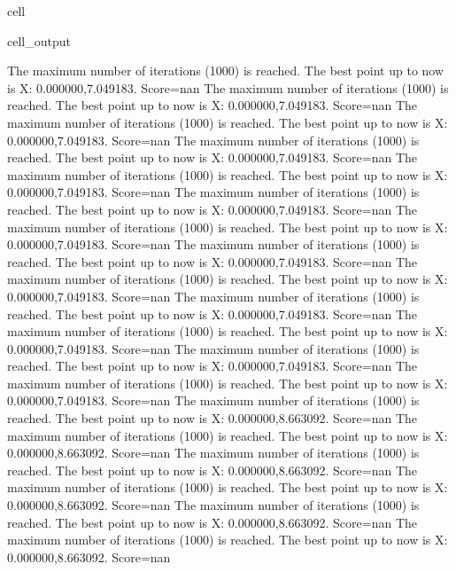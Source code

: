 \documentclass[letterpaper,10pt,english]{jupyterBook}
\begin{document}
\begin{sphinxuseclass}{cell}
\begin{sphinxVerbatimOutput}
\begin{sphinxuseclass}{cell_output}
\begin{sphinxVerbatim}[commandchars=\\\{\}]
The maximum number of iterations (1000) is reached. The best point up to now is X: \PYGZob{}0.000000,7.049183\PYGZcb{}. Score=\PYGZhy{}nan
The maximum number of iterations (1000) is reached. The best point up to now is X: \PYGZob{}0.000000,7.049183\PYGZcb{}. Score=\PYGZhy{}nan
The maximum number of iterations (1000) is reached. The best point up to now is X: \PYGZob{}0.000000,7.049183\PYGZcb{}. Score=\PYGZhy{}nan
The maximum number of iterations (1000) is reached. The best point up to now is X: \PYGZob{}0.000000,7.049183\PYGZcb{}. Score=\PYGZhy{}nan
The maximum number of iterations (1000) is reached. The best point up to now is X: \PYGZob{}0.000000,7.049183\PYGZcb{}. Score=\PYGZhy{}nan
The maximum number of iterations (1000) is reached. The best point up to now is X: \PYGZob{}0.000000,7.049183\PYGZcb{}. Score=\PYGZhy{}nan
The maximum number of iterations (1000) is reached. The best point up to now is X: \PYGZob{}0.000000,7.049183\PYGZcb{}. Score=\PYGZhy{}nan
The maximum number of iterations (1000) is reached. The best point up to now is X: \PYGZob{}0.000000,7.049183\PYGZcb{}. Score=\PYGZhy{}nan
The maximum number of iterations (1000) is reached. The best point up to now is X: \PYGZob{}0.000000,7.049183\PYGZcb{}. Score=\PYGZhy{}nan
The maximum number of iterations (1000) is reached. The best point up to now is X: \PYGZob{}0.000000,7.049183\PYGZcb{}. Score=\PYGZhy{}nan
The maximum number of iterations (1000) is reached. The best point up to now is X: \PYGZob{}0.000000,7.049183\PYGZcb{}. Score=\PYGZhy{}nan
The maximum number of iterations (1000) is reached. The best point up to now is X: \PYGZob{}0.000000,7.049183\PYGZcb{}. Score=\PYGZhy{}nan
The maximum number of iterations (1000) is reached. The best point up to now is X: \PYGZob{}0.000000,7.049183\PYGZcb{}. Score=\PYGZhy{}nan
The maximum number of iterations (1000) is reached. The best point up to now is X: \PYGZob{}0.000000,8.663092\PYGZcb{}. Score=\PYGZhy{}nan
The maximum number of iterations (1000) is reached. The best point up to now is X: \PYGZob{}0.000000,8.663092\PYGZcb{}. Score=\PYGZhy{}nan
The maximum number of iterations (1000) is reached. The best point up to now is X: \PYGZob{}0.000000,8.663092\PYGZcb{}. Score=\PYGZhy{}nan
The maximum number of iterations (1000) is reached. The best point up to now is X: \PYGZob{}0.000000,8.663092\PYGZcb{}. Score=\PYGZhy{}nan
The maximum number of iterations (1000) is reached. The best point up to now is X: \PYGZob{}0.000000,8.663092\PYGZcb{}. Score=\PYGZhy{}nan
The maximum number of iterations (1000) is reached. The best point up to now is X: \PYGZob{}0.000000,8.663092\PYGZcb{}. Score=\PYGZhy{}nan

\end{sphinxVerbatim}
\end{sphinxuseclass}
\end{sphinxVerbatimOutput}
\end{sphinxuseclass}
\end{document}
